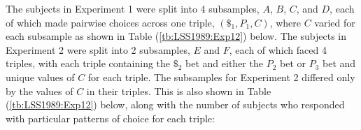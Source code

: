 \documentclass[../main.tex]{subfiles}
\begin{document}
The subjects in Experiment 1 were split into 4 subsamples, $A$, $B$, $C$, and $D$, each of which made pairwise choices across one triple, $({\$}_1,P_1,C)$, where $C$ varied for each subsample as shown in Table (\ref{tb:LSS1989:Exp12}) below.
The subjects in Experiment 2 were split into 2 subsamples, $E$ and $F$, each of which faced 4 triples, with each triple containing the ${\$}_2$ bet and either the $P_2$ bet or $P_3$ bet and unique values of $C$ for each triple.
The subsamples for Experiment 2 differed only by the values of $C$ in their triples.
This is also shown in Table (\ref{tb:LSS1989:Exp12}) below, along with the number of subjects who responded with particular patterns of choice for each triple:

\end{document}
